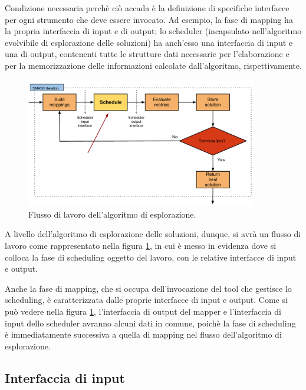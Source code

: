 Condizione necessaria perchè ciò accada è la definizione di specifiche 
interfacce per ogni strumento che deve essere invocato. Ad esempio, la fase di 
mapping ha la propria interfaccia di input e di output; lo scheduler 
(incapsulato nell'algoritmo evolvibile di esplorazione delle soluzioni) ha 
anch'esso una interfaccia di input e una di output, contenenti tutte 
le strutture dati necessarie per l'elaborazione e per la memorizzazione delle 
informazioni calcolate dall'algoritmo, rispettivamente. 

\begin{figure}
 \begin{center}
  \includegraphics[width=0.9\textwidth]{capitoli/figure/cap3/MapperWorkflow.pdf}
  \caption{Flusso di lavoro dell'algoritmo di esplorazione.}
  \label{fig:mapperWorkflow}
 \end{center}
\end{figure}

A livello dell'algoritmo di esplorazione delle soluzioni, dunque, si avrà un 
flusso di lavoro come rappresentato nella figura \ref{fig:mapperWorkflow}, in 
cui è messo in evidenza dove si colloca la fase di scheduling oggetto del 
lavoro, con le relative interfacce di input e output.

Anche la fase di mapping, che si occupa dell'invocazione del tool che gestisce lo 
scheduling, è caratterizzata dalle proprie interfacce di input e output. Come 
si può vedere nella figura \ref{fig:mapperWorkflow}, l'interfaccia di 
output del mapper e l'interfaccia di input dello scheduler avranno alcuni dati 
in comune, poichè la fase di scheduling è immediatamente successiva a quella di mapping
nel flusso dell'algoritmo di esplorazione.


\subsection{Interfaccia di input}


